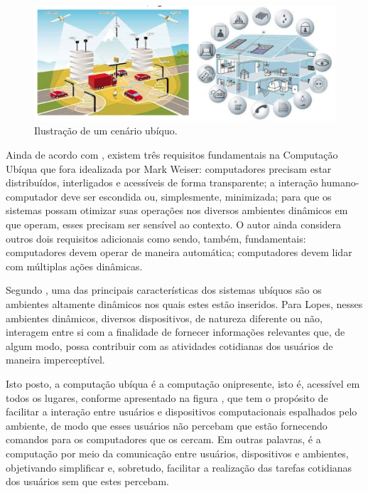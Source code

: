 \begin{figure}[htp]
\begin{center}
  \includegraphics[width=14cm]{images/cenario_ubiquo.png}
  \caption[Ilustração de um cenário ubíquo]{Ilustração de um cenário ubíquo.}
  \label{fig:exampleFigCenarioUbiquo}
\end{center}
\end{figure}

Ainda de acordo com \cite{poslad2009}, existem três requisitos fundamentais na Computação Ubíqua que fora idealizada por Mark Weiser: computadores precisam estar distribuídos, interligados e acessíveis de forma transparente; a interação humano-computador deve ser escondida ou, simplesmente, minimizada; para que os sistemas possam otimizar suas operações nos diversos ambientes dinâmicos em que operam, esses precisam ser sensível ao contexto.  O autor ainda considera outros dois requisitos adicionais como sendo, também, fundamentais: computadores devem operar de maneira automática; computadores devem lidar com  múltiplas ações dinâmicas. 
	
Segundo \cite{lopes2011}, uma das principais características dos sistemas ubíquos são os ambientes altamente dinâmicos  nos quais estes estão inseridos. Para Lopes, nesses ambientes dinâmicos, diversos dispositivos, de natureza diferente ou não, interagem entre si com a finalidade de fornecer informações relevantes que, de algum modo, possa contribuir com as atividades cotidianas dos usuários de maneira imperceptível.
	
Isto posto, a computação ubíqua é a computação onipresente, isto é, acessível em todos os lugares, conforme apresentado na figura , que tem o propósito de facilitar a interação entre usuários e dispositivos computacionais espalhados pelo ambiente, de modo que esses usuários não percebam que estão fornecendo comandos para os computadores que os cercam.  Em outras palavras, é a computação por meio da comunicação entre usuários, dispositivos e ambientes, objetivando simplificar e, sobretudo, facilitar a realização das tarefas cotidianas dos usuários sem que estes percebam.



